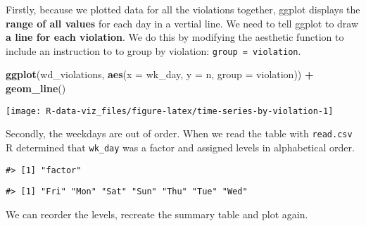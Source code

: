 \documentclass[]{book}
\newenvironment{Shaded}{\begin{snugshade}}{\end{snugshade}}
\newcommand{\KeywordTok}[1]{\textcolor[rgb]{0.13,0.29,0.53}{\textbf{#1}}}
\newcommand{\DataTypeTok}[1]{\textcolor[rgb]{0.13,0.29,0.53}{#1}}
\newcommand{\StringTok}[1]{\textcolor[rgb]{0.31,0.60,0.02}{#1}}
\newcommand{\OperatorTok}[1]{\textcolor[rgb]{0.81,0.36,0.00}{\textbf{#1}}}
\newcommand{\NormalTok}[1]{#1}
\theoremstyle{definition}
\theoremstyle{definition}
\theoremstyle{definition}
\theoremstyle{remark}
\begin{document}
Firstly, because we plotted data for all the violations together, ggplot
displays the \textbf{range of all values} for each day in a vertial
line. We need to tell ggplot to draw \textbf{a line for each violation}.
We do this by modifying the aesthetic function to include an instruction
to to group by violation: \texttt{group\ =\ violation}.

\begin{Shaded}
\begin{Highlighting}[]
\KeywordTok{ggplot}\NormalTok{(wd_violations, }\KeywordTok{aes}\NormalTok{(}\DataTypeTok{x =}\NormalTok{ wk_day, }\DataTypeTok{y =}\NormalTok{ n, }\DataTypeTok{group =}\NormalTok{ violation)) }\OperatorTok{+}
\StringTok{  }\KeywordTok{geom_line}\NormalTok{()}
\end{Highlighting}
\end{Shaded}

\texttt{[image: R-data-viz\_files/figure-latex/time-series-by-violation-1]}

Secondly, the weekdays are out of order. When we read the table with
\texttt{read.csv} R determined that \texttt{wk\_day} was a factor and
assigned levels in alphabetical order.

\begin{Shaded}
\end{Shaded}

\begin{verbatim}
#> [1] "factor"
\end{verbatim}

\begin{Shaded}
\end{Shaded}

\begin{verbatim}
#> [1] "Fri" "Mon" "Sat" "Sun" "Thu" "Tue" "Wed"
\end{verbatim}

We can reorder the levels, recreate the summary table and plot again.
\end{document}
